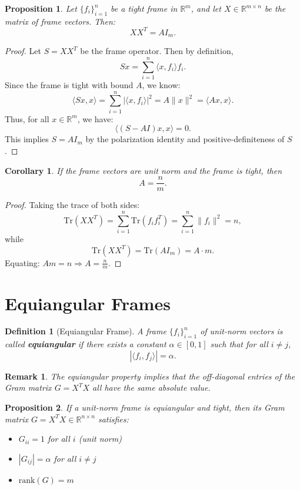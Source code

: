 \documentclass[12pt]{article}
\newtheorem{definition}{Definition}
\newtheorem{proposition}{Proposition}
\newtheorem{remark}{Remark}
\newtheorem{corollary}{Corollary}
\begin{document}
\begin{proposition}
Let $\{f_i\}_{i=1}^n$ be a tight frame in $\mathbb{R}^m$, and let $X \in \mathbb{R}^{m \times n}$ be the matrix of frame vectors. Then:
\[
XX^T = A I_m.
\]
\end{proposition}

\begin{proof}
Let $S = XX^T$ be the frame operator. Then by definition,
\[
Sx = \sum_{i=1}^n \langle x, f_i \rangle f_i.
\]
Since the frame is tight with bound $A$, we know:
\[
\langle Sx, x \rangle = \sum_{i=1}^n |\langle x, f_i \rangle|^2 = A \|x\|^2 = \langle A x, x \rangle.
\]
Thus, for all $x \in \mathbb{R}^m$, we have:
\[
\langle (S - A I)x, x \rangle = 0.
\]
This implies $S = A I_m$ by the polarization identity and positive-definiteness of $S$.
\end{proof}

\begin{corollary}
If the frame vectors are unit norm and the frame is tight, then
\[
A = \frac{n}{m}.
\]
\end{corollary}

\begin{proof}
Taking the trace of both sides:
\[
\text{Tr}(XX^T) = \sum_{i=1}^n \text{Tr}(f_i f_i^T) = \sum_{i=1}^n \|f_i\|^2 = n,
\]
while
\[
\text{Tr}(XX^T) = \text{Tr}(A I_m) = A \cdot m.
\]
Equating: \( A m = n \Rightarrow A = \frac{n}{m} \).
\end{proof}

\section{Equiangular Frames}

\begin{definition}[Equiangular Frame]
A frame $\{f_i\}_{i=1}^n$ of unit-norm vectors is called \textbf{equiangular} if there exists a constant $\alpha \in [0,1]$ such that for all $i \ne j$,
\[
|\langle f_i, f_j \rangle| = \alpha.
\]
\end{definition}

\begin{remark}
The equiangular property implies that the off-diagonal entries of the Gram matrix $G = X^T X$ all have the same absolute value.
\end{remark}

\begin{proposition}
If a unit-norm frame is equiangular and tight, then its Gram matrix $G = X^T X \in \mathbb{R}^{n \times n}$ satisfies:
\begin{itemize}
    \item $G_{ii} = 1$ for all $i$ (unit norm)
    \item $|G_{ij}| = \alpha$ for all $i \ne j$
    \item $\text{rank}(G) = m$
\end{itemize}
\end{proposition}
\end{document}
